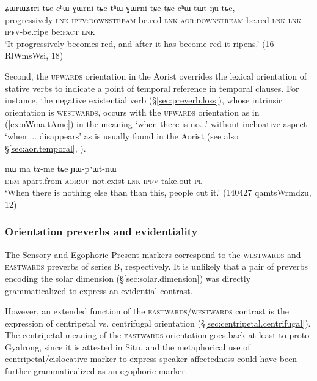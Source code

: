 \begin{exe}
\ex \label{ex:chWGWrni}
\gll ʑɯrɯʑɤri tɕe cʰɯ-ɣɯrni tɕe tʰɯ-ɣɯrni tɕe tɕe cʰɯ-tɯt ŋu tɕe,  \\
progressively \textsc{lnk} \textsc{ipfv}:\textsc{downstream}-be.red \textsc{lnk} \textsc{aor}:\textsc{downstream}-be.red \textsc{lnk} \textsc{lnk} \textsc{ipfv}-be.ripe be:\textsc{fact} \textsc{lnk}  \\
\glt `It progressively becomes red, and after it has become red it ripens.' (16-RlWmsWsi, 18)
\end{exe}

Second, the \textsc{upwards} orientation in the Aorist overrides the lexical orientation of stative verbs to indicate a point of temporal reference in temporal clauses. For instance, the negative existential verb  (§\ref{sec:preverb.loss}), whose intrinsic orientation is \textsc{westwards}, occurs with the \textsc{upwards} orientation as in (\ref{ex:nWma.tAme}) in the meaning `when there is no...' without inchoative aspect `when ... disappears' as is usually found in the Aorist (see also §\ref{sec:aor.temporal}, \citealt[283, fn 10]{jacques14linking}).

\begin{exe}
\ex \label{ex:nWma.tAme}
\gll  nɯ ma tɤ-me tɕe ɲɯ-pʰɯt-nɯ  \\
\textsc{dem} apart.from \textsc{aor}:\textsc{up}-not.exist \textsc{lnk}  \textsc{ipfv}-take.out-\textsc{pl}   \\
\glt `When there is nothing else than than this, people cut it.' (140427 qamtsWrmdzu, 12)
\end{exe} 

\subsubsection{Orientation preverbs and evidentiality} \label{sec:orientation.preverb.evd}
The Sensory  and Egophoric Present  markers correspond to the \textsc{westwards} and \textsc{eastwards} preverbs of series B, respectively. It is unlikely that a pair of preverbs encoding the solar dimension (§\ref{sec:solar.dimension}) was directly grammaticalized to express an evidential contrast.

However, an extended function of the \textsc{eastwards}/\textsc{westwards} contrast is the expression of centripetal vs. centrifugal orientation (§\ref{sec:centripetal.centrifugal}). The centripetal meaning of the \textsc{eastwards} orientation goes back at least to proto-Gyalrong, since it is attested in Situ, and the metaphorical use of centripetal/cislocative marker to express speaker affectedness could have been further grammaticalized as an egophoric marker. 


